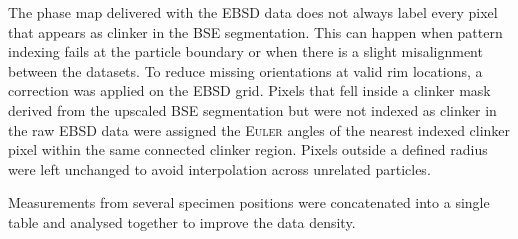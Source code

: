 The phase map delivered with the \ac{EBSD} data does not always label every pixel that appears as clinker in the \ac{BSE} segmentation. 
This can happen when pattern indexing fails at the particle boundary or when there is a slight misalignment between the datasets.
To reduce missing orientations at valid rim locations, a correction was applied on the \ac{EBSD} grid.
Pixels that fell inside a clinker mask derived from the upscaled \ac{BSE} segmentation but were not indexed as clinker in the raw \ac{EBSD} data were assigned the \textsc{Euler} angles of the nearest indexed clinker pixel within the same connected clinker region.
Pixels outside a defined radius were left unchanged to avoid interpolation across unrelated particles.

Measurements from several specimen positions were concatenated into a single table and analysed together to improve the data density.

